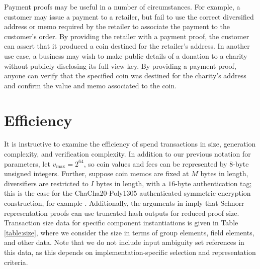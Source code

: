 \documentclass{llncs}
\begin{document}
Payment proofs may be useful in a number of circumstances.
For example, a customer may issue a payment to a retailer, but fail to use the correct diversified address or memo required by the retailer to associate the payment to the customer's order.
By providing the retailer with a payment proof, the customer can assert that it produced a coin destined for the retailer's address.
In another use case, a business may wish to make public details of a donation to a charity without publicly disclosing its full view key.
By providing a payment proof, anyone can verify that the specified coin was destined for the charity's address and confirm the value and memo associated to the coin.


\section{Efficiency}

It is instructive to examine the efficiency of spend transactions in size, generation complexity, and verification complexity.
In addition to our previous notation for parameters, let $v_{\text{max}} = 2^{64}$, so coin values and fees can be represented by $8$-byte unsigned integers.
Further, suppose coin memos are fixed at $M$ bytes in length, diversifiers are restricted to $I$ bytes in length, with a $16$-byte authentication tag; this is the case for the ChaCha20-Poly1305 authenticated symmetric encryption construction, for example \cite{chachapoly}.
Additionally, the arguments in \cite{schnorr} imply that Schnorr representation proofs can use truncated hash outputs for reduced proof size.
Transaction size data for specific component instantiations is given in Table \ref{table:size}, where we consider the size in terms of group elements, field elements, and other data.
Note that we do not include input ambiguity set references in this data, as this depends on implementation-specific selection and representation criteria.
\end{document}
